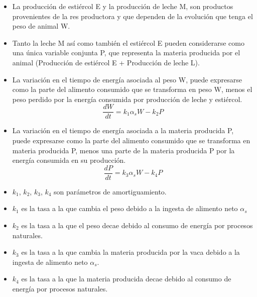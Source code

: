 \begin{itemize}
        
    \item La producción de estiércol E y la producción de leche M, son productos provenientes de la res productora y que dependen de la evolución que tenga el peso de animal W.

    \item Tanto la leche M así como también el estiércol E pueden considerarse como una única variable conjunta P, que representa la materia producida por el animal (Producción de estiércol E + Producción de leche L).
    
    \item La variación en el tiempo de energía asociada al peso W, puede expresarse como 
    la parte del alimento consumido que se transforma en peso W, menos el peso perdido por la energía consumida por producción de leche y estiércol.
    \begin{equation} \label{modwp1}
        \frac{dW}{dt} = k_{1}\alpha_{s}W - k_{2}P
    \end{equation}
    
    \item La variación en el tiempo de energía asociada a la materia producida P, puede expresarse como 
    la parte del alimento consumido que se transforma en materia producida P, menos una parte de la materia producida P por la energía consumida en su producción.
    \begin{equation}\label{modwp2}
        \frac{dP}{dt} = k_{3}\alpha_{s}W - k_{4}P
    \end{equation}
    
    \item $k_{1}$, $k_{2}$, $k_{3}$, $k_{4}$ son parámetros de amortiguamiento. 
    \item $k_{1}$ es la tasa a la que cambia el peso debido a la ingesta de alimento neto $\alpha_{s}$
    \item $k_{2}$ es la tasa a la que el peso decae debido al consumo de energía por procesos naturales.
    \item $k_{3}$ es la tasa a la que cambia la materia producida por la vaca debido a la ingesta de alimento neto $\alpha_{s}$.
    \item $k_{4}$ es la tasa a la que la materia producida decae debido al consumo de energía por procesos naturales.
    
\end{itemize}

